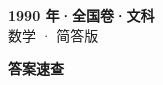 \documentclass[zihao=-4, a4paper]{ctexart}
\begin{document}
\begin{center}
  {\Large\bfseries 1990 年·全国卷·文科}\\[4pt]
  {\large 数学 · 简答版}
\end{center}
\medskip
{}

\clearpage
{}
\begin{center}{\Large\bfseries 答案速查}\end{center}
\medskip

\end{document}

